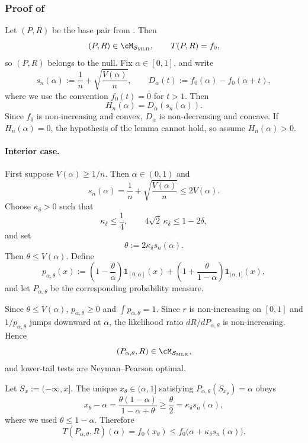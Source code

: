 \documentclass[english]{article}
\theoremstyle{plain}
\theoremstyle{definition}
\newcommand{\Toff}[2]{T(#1,#2)}
\newcommand{\fnull}{f_0}
\newcommand{\smlr}{\mathcal{S}_{\mathrm{MLR}}}     %
\begin{document}
\subsubsection{Proof of }

Let \((P,R)\) be the base pair from .  Then
\[
(P,R)\in\cM_{\smlr},
\qquad
\Toff{P}{R}=\fnull,
\]
so \((P,R)\) belongs to the null.  Fix \(\alpha\in[0,1]\), and write
\[
s_n(\alpha):=\frac1n+\sqrt{\frac{V(\alpha)}{n}},
\qquad
D_\alpha(t):=\fnull(\alpha)-\fnull(\alpha+t),
\]
where we use the convention \(\fnull(t)=0\) for \(t>1\).  Then
\[
H_n(\alpha)=D_\alpha(s_n(\alpha)).
\]
Since \(\fnull\) is non-increasing and convex, \(D_\alpha\) is
non-decreasing and concave.  If \(H_n(\alpha)=0\), the hypothesis of the
lemma cannot hold, so assume \(H_n(\alpha)>0\).

\paragraph{Interior case.}
First suppose \(V(\alpha)\geqslant 1/n\).  Then \(\alpha\in(0,1)\) and
\[
s_n(\alpha)
=
\frac1n+\sqrt{\frac{V(\alpha)}{n}}
\leqslant
2V(\alpha).
\]
Choose \(\kappa_\delta>0\) such that
\[
\kappa_\delta\leqslant \frac14,
\qquad
4\sqrt 2\,\kappa_\delta\leqslant 1-2\delta,
\]
and set
\[
\theta:=2\kappa_\delta s_n(\alpha).
\]
Then \(\theta\leqslant V(\alpha)\).  Define
\[
p_{\alpha,\theta}(x)
:=
\left(1-\frac{\theta}{\alpha}\right)\mathbf 1_{[0,\alpha]}(x)
+
\left(1+\frac{\theta}{1-\alpha}\right)\mathbf 1_{(\alpha,1]}(x),
\]
and let \(P_{\alpha,\theta}\) be the corresponding probability measure.

Since \(\theta\leqslant V(\alpha)\), \(p_{\alpha,\theta}\geqslant0\) and
\(\int p_{\alpha,\theta}=1\).  Since \(r\) is non-increasing on \([0,1]\)
and \(1/p_{\alpha,\theta}\) jumps downward at \(\alpha\), the likelihood
ratio \(dR/dP_{\alpha,\theta}\) is non-increasing.  Hence
\[
(P_{\alpha,\theta},R)\in\cM_{\smlr},
\]
and lower-tail tests are Neyman--Pearson optimal.

Let \(S_x:=(-\infty,x]\).  The unique \(x_\theta\in(\alpha,1]\) satisfying
\(P_{\alpha,\theta}(S_{x_\theta})=\alpha\) obeys
\[
x_\theta-\alpha
=
\frac{\theta(1-\alpha)}{1-\alpha+\theta}
\geqslant
\frac{\theta}{2}
=
\kappa_\delta s_n(\alpha),
\]
where we used \(\theta\leqslant1-\alpha\).  Therefore
\[
\Toff{P_{\alpha,\theta}}{R}(\alpha)
=
\fnull(x_\theta)
\leqslant
\fnull\bigl(\alpha+\kappa_\delta s_n(\alpha)\bigr).
\]
\end{document}
